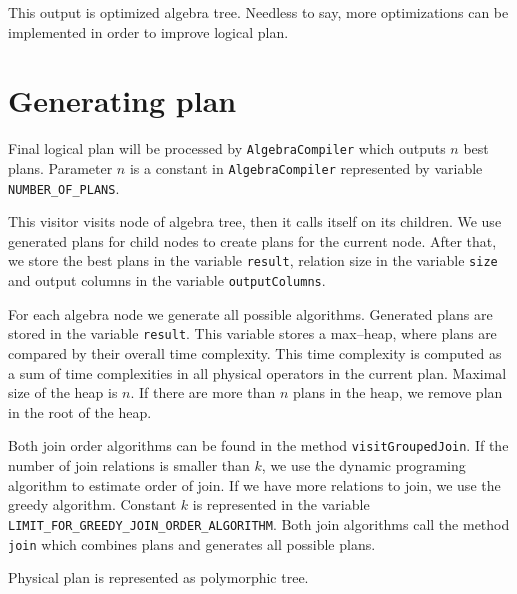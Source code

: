 This output is optimized algebra tree. Needless to say, more optimizations can be implemented in order to improve logical plan.

\section{Generating plan}

Final logical plan will be processed by \texttt{AlgebraCompiler} which outputs $n$ best plans. Parameter $n$ is a constant in  \texttt{AlgebraCompiler} represented by variable \texttt{NUM\-BER\_\-OF\_\-PLANS}. 

This visitor visits node of algebra tree, then it calls itself on its children. We use generated plans for child nodes to create plans for the current node. After that, we store the best plans in the variable \texttt{result}, relation size in the variable \texttt{size} and output columns in the variable \texttt{outputColumns}. 

For each algebra node we generate all possible algorithms. Generated plans are stored in the variable \texttt{result}. This variable stores a max--heap, where plans are compared by their overall time complexity. This time complexity is computed as a sum of time complexities in all physical operators in the current plan. Maximal size of the heap is $n$. If there are more than $n$ plans in the heap, we remove plan in the root of the heap.

Both join order algorithms can be found in the method \texttt{visitGroupedJoin}. If the number of join relations is smaller than $k$, we use the dynamic programing algorithm to estimate order of join. If we have more relations to join, we use the greedy algorithm. Constant $k$ is represented in the variable \texttt{LI\-MIT\_\-FOR\_\-GREEDY\_\-JOIN\_\-ORDER\_\-ALGORITHM}. Both join algorithms call the method \texttt{join} which combines plans and generates all possible plans.


Physical plan is represented as polymorphic tree. 


